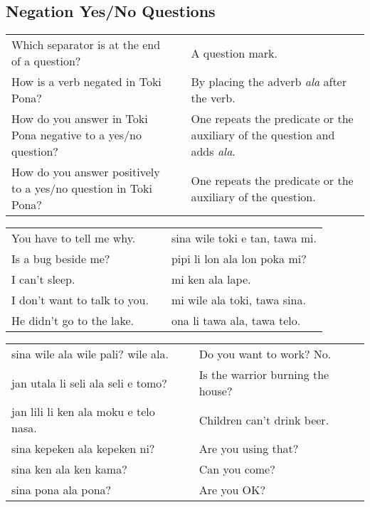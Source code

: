 \newpage
%
\subsection*{Negation Yes/No Questions} 
\label{'negation_yes_no_questions'}
%
\begin{supertabular}{p{5,5cm}|ll}
Which separator is at the end of a question? && A question mark. \\ %
How is a verb negated in Toki Pona? && By placing the adverb \textit{ala} after the verb.  \\ %
How do you answer in Toki Pona negative to a yes/no question? && One repeats the predicate or the auxiliary of the question and adds \textit{ala}. \\ %
How do you answer positively to a yes/no question in Toki Pona? && One repeats the predicate or the auxiliary of the question. \\ %
\end{supertabular} 

\begin{supertabular}{p{5,5cm}|ll}
You have to tell me why.  && sina wile toki e tan, tawa mi. \\ %
Is a bug beside me?  && pipi li lon ala lon poka mi? \\ %
I can't sleep.  && mi ken ala lape. \\ %
I don't want to talk to you.  && mi wile ala toki, tawa sina. \\ %
He didn't go to the lake.  && ona li tawa ala, tawa telo. \\ %
\end{supertabular}  

\begin{supertabular}{p{5,5cm}|ll}
sina wile ala wile pali? wile ala.  && Do you want to work? No. \\
jan utala li seli ala seli e tomo?  && Is the warrior burning the house? \\
jan lili li ken ala moku e telo nasa.  && Children can't drink beer. \\
sina kepeken ala kepeken ni?  && Are you using that? \\
sina ken ala ken kama?  && Can you come? \\
sina pona ala pona? && Are you OK? \\
\end{supertabular} 

